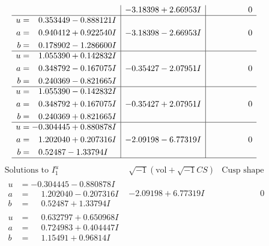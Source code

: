 \documentclass[1p]{elsarticle_modified}
\theoremstyle{definition}
\newcommand{\I}{\sqrt{-1}}
\begin{document}
$$\begin{array}{c|c|c}
 & -3.18398 + 2.66953 I & \phantom{-0.000000 } 0 \\ \hline\begin{aligned}
u &= \phantom{-}0.353449 - 0.888121 I \\
a &= \phantom{-}0.940412 + 0.922540 I \\
b &= \phantom{-}0.178902 - 1.286600 I\end{aligned}
 & -3.18398 - 2.66953 I & \phantom{-0.000000 } 0 \\ \hline\begin{aligned}
u &= \phantom{-}1.055390 + 0.142832 I \\
a &= \phantom{-}0.348792 - 0.167075 I \\
b &= \phantom{-}0.240369 - 0.821665 I\end{aligned}
 & -0.35427 - 2.07951 I & \phantom{-0.000000 } 0 \\ \hline\begin{aligned}
u &= \phantom{-}1.055390 - 0.142832 I \\
a &= \phantom{-}0.348792 + 0.167075 I \\
b &= \phantom{-}0.240369 + 0.821665 I\end{aligned}
 & -0.35427 + 2.07951 I & \phantom{-0.000000 } 0 \\ \hline\begin{aligned}
u &= -0.304445 + 0.880878 I \\
a &= \phantom{-}1.202040 + 0.207316 I \\
b &= \phantom{-}0.52487 - 1.33794 I\end{aligned}
 & -2.09198 - 6.77319 I & \phantom{-0.000000 } 0\\
 \hline 
 \end{array}$$\newpage$$\begin{array}{c|c|c}  
\text{Solutions to }I^u_{1}& \I (\text{vol} + \sqrt{-1}CS) & \text{Cusp shape}\\
 \hline 
\begin{aligned}
u &= -0.304445 - 0.880878 I \\
a &= \phantom{-}1.202040 - 0.207316 I \\
b &= \phantom{-}0.52487 + 1.33794 I\end{aligned}
 & -2.09198 + 6.77319 I & \phantom{-0.000000 } 0 \\ \hline\begin{aligned}
u &= \phantom{-}0.632797 + 0.650968 I \\
a &= \phantom{-}0.724983 + 0.404447 I \\
b &= \phantom{-}1.15491 + 0.96814 I\end{aligned}

\end{array}$$
\end{document}
